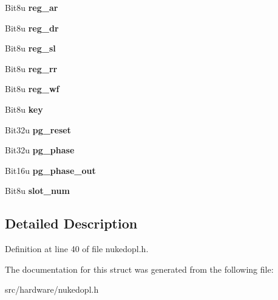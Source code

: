 \begin{DoxyCompactItemize}
\item 
\hypertarget{struct__opl3__slot_a6531bc7ae9995e99ca72d579741bccb3}{Bit8u {\bfseries reg\-\_\-ar}}\label{struct__opl3__slot_a6531bc7ae9995e99ca72d579741bccb3}

\item 
\hypertarget{struct__opl3__slot_adeda6e63e5c67b78d2b86da844aef4e3}{Bit8u {\bfseries reg\-\_\-dr}}\label{struct__opl3__slot_adeda6e63e5c67b78d2b86da844aef4e3}

\item 
\hypertarget{struct__opl3__slot_a6f4fae5b20cfc89db8c0c16519d4830d}{Bit8u {\bfseries reg\-\_\-sl}}\label{struct__opl3__slot_a6f4fae5b20cfc89db8c0c16519d4830d}

\item 
\hypertarget{struct__opl3__slot_a8a760a41341ece04bd1b5b0b5933d0c2}{Bit8u {\bfseries reg\-\_\-rr}}\label{struct__opl3__slot_a8a760a41341ece04bd1b5b0b5933d0c2}

\item 
\hypertarget{struct__opl3__slot_a49918af0326cb9550fdab89f4c002f59}{Bit8u {\bfseries reg\-\_\-wf}}\label{struct__opl3__slot_a49918af0326cb9550fdab89f4c002f59}

\item 
\hypertarget{struct__opl3__slot_a49026a41e3cf4a3c3fb8cfe9a6dbc0e0}{Bit8u {\bfseries key}}\label{struct__opl3__slot_a49026a41e3cf4a3c3fb8cfe9a6dbc0e0}

\item 
\hypertarget{struct__opl3__slot_adf6561ade7760a9d6e6fa19e933fe1ce}{Bit32u {\bfseries pg\-\_\-reset}}\label{struct__opl3__slot_adf6561ade7760a9d6e6fa19e933fe1ce}

\item 
\hypertarget{struct__opl3__slot_a90106b5a75cebedf25e3aba2189202f2}{Bit32u {\bfseries pg\-\_\-phase}}\label{struct__opl3__slot_a90106b5a75cebedf25e3aba2189202f2}

\item 
\hypertarget{struct__opl3__slot_a94cde8b212d6f6f57b7144c850b57536}{Bit16u {\bfseries pg\-\_\-phase\-\_\-out}}\label{struct__opl3__slot_a94cde8b212d6f6f57b7144c850b57536}

\item 
\hypertarget{struct__opl3__slot_af66a5ad7a86bc3e34f56807c8499ceb8}{Bit8u {\bfseries slot\-\_\-num}}\label{struct__opl3__slot_af66a5ad7a86bc3e34f56807c8499ceb8}

\end{DoxyCompactItemize}


\subsection{Detailed Description}


Definition at line 40 of file nukedopl.\-h.



The documentation for this struct was generated from the following file\-:\begin{DoxyCompactItemize}
\item 
src/hardware/nukedopl.\-h\end{DoxyCompactItemize}
